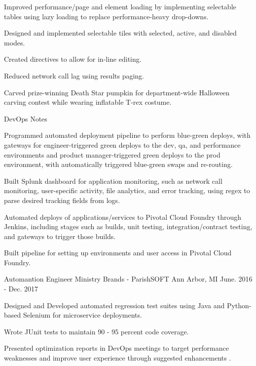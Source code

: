 \begin{cventries}
{\begin{cvitems}
\item {Improved performance/page and element loading by implementing selectable tables using lazy loading to replace performance-heavy drop-downs.}
\item {Designed and implemented selectable tiles with selected, active, and disabled modes.}
\item {Created directives to allow for in-line editing.}
\item {Reduced network call lag using results paging.}
\item {Carved prize-winning Death Star pumpkin for department-wide Halloween carving contest while wearing inflatable T-rex costume.}
\end{cvitems}
}
\cventry
{DevOps Notes} {}{} {} %
{ %
\begin{cvitems}
\item {Programmed automated deployment pipeline to perform blue-green deploys, with gateways for engineer-triggered green deploys to the dev, qa, and performance environments and product manager-triggered green deploys to the prod environment, with automatically triggered blue-green swaps and re-routing.}
\item {Built Splunk dashboard for application monitoring, such as network call monitoring, user-specific activity, file analytics, and error tracking, using regex to parse desired tracking fields from logs.}
\item {Automated deploys of applications/services to Pivotal Cloud Foundry through Jenkins, including stages such as builds, unit testing, integration/contract testing, and gateways to trigger those builds.}
\item {Built pipeline for setting up environments and user access in Pivotal Cloud Foundry.}
\end{cvitems}
}


\vskip 2mm
\cventry
{Automantion Engineer} %
{Ministry Brands - ParishSOFT} %
{Ann Arbor, MI} %
{June. 2016 - Dec. 2017} %
{ %
\begin{cvitems}
\item {Designed and Developed automated regression test suites using Java and Python-based Selenium for microservice deployments.}
\item {Wrote JUnit tests to maintain 90 - 95 percent code coverage.}
\item {Presented optimization reports in DevOps meetings to target performance weaknesses and improve user experience through suggested enhancements
.}
\end{cvitems}
}


\end{cventries}
